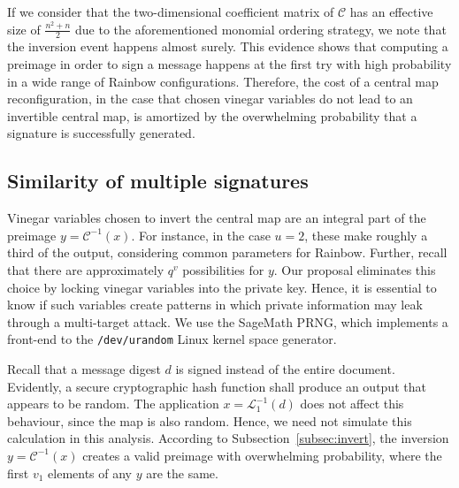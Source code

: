 \documentclass[draft, 12pt, a4paper, oneside]{memoir}
\theoremstyle{definition}
\begin{document}
If we consider that the two-dimensional coefficient matrix of $\mathcal{C}$ has
an effective size of $\frac{n^{2} + n}{2}$ due to the aforementioned monomial
ordering strategy, we note that the inversion event happens almost surely.
This evidence shows that computing a preimage in order to sign a message
happens at the first try with high probability in a wide range of Rainbow
configurations. Therefore, the cost of a central map reconfiguration, in the
case that chosen vinegar variables do not lead to an invertible central map, is
amortized by the overwhelming probability that a signature is successfully
generated.

\subsection{Similarity of multiple signatures}\label{subsec:similar}

Vinegar variables chosen to invert the central map are an integral part of the
preimage $y = \mathcal{C}^{-1}(x)$. For instance, in the case $u = 2$, these
make roughly a third of the output, considering common parameters for Rainbow.
Further, recall that there are approximately $q^v$ possibilities for $y$. Our
proposal eliminates this choice by locking vinegar variables into the private
key. Hence, it is essential to know if such variables create patterns in which
private information may leak through a multi-target attack. We use the SageMath
PRNG, which implements a front-end to the \texttt{/dev/urandom} Linux kernel
space generator.

Recall that a message digest $d$ is signed instead of the entire document.
Evidently, a secure cryptographic hash function shall produce an output that
appears to be random. The application $x = \mathcal{L}_{1}^{-1}(d)$ does not affect
this behaviour, since the map is also random. Hence, we need not simulate this
calculation in this analysis. According to Subsection~\ref{subsec:invert}, the
inversion $y = \mathcal{C}^{-1}(x)$ creates a valid preimage with overwhelming
probability, where the first $v_{1}$ elements of any $y$ are the same.
\end{document}
